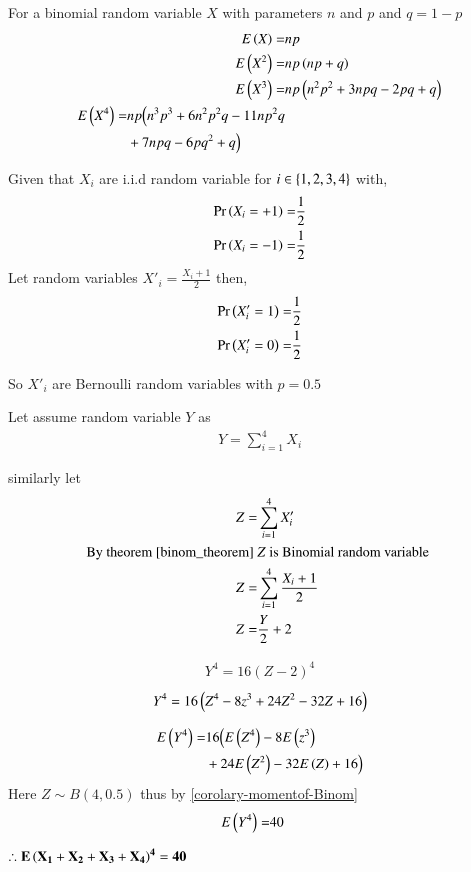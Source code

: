 \documentclass[journal,12pt,twocolumn]{IEEEtran}
\begin{document}
\begin{corollary}
For a binomial random variable $X$ with parameters $n$ and $p$ and $q=1-p$
\begin{align}
    E\left(X\right)=& n p 
    \\E\left(X^2\right)=& n p \left(n p+q\right)
    \\E\left(X^3\right)=& n p \left(n^{2} p^{2} + 3 n p q - 2 p q + q\right)
    \\
    \begin{split}
         E\left(X^4\right)=&n p \Bigl(n^{3} p^{3} + 6 n^{2} p^{2} q
        - 11 n p^{2} q  \\& + 7 n p q - 6 p q^{2} + q\Bigr)
    \end{split}
\end{align}
\label{corolary-momentof-Binom}
\end{corollary}
Given that $X_i$ are i.i.d random variable for $i \in \left\{1,2,3,4\right\} $ 
with,
\begin{align}
    \Pr\left(X_i=+1\right)=&\frac{1}{2}
    \\\Pr\left(X_i=-1\right)=&\frac{1}{2}
\end{align}
Let random variables $X'_i=\frac{X_i+1}{2}$ then,
\begin{align}
    \Pr\left(X'_i=1\right)=&\frac{1}{2}
    \\\Pr\left(X'_i=0\right)=&\frac{1}{2}
\end{align}

So $X'_i$ are Bernoulli random variables with $p=0.5$

Let assume random variable $Y$ as
\begin{align}
Y=\sum_{i=1}^{4}X_i
\end{align} 

similarly let 
\begin{align}
Z=&\sum_{i=1}^{4}X'_i
\\ \nonumber \text{By theorem \ref{binom_theorem} } &  Z \text{ is Binomial random variable }
\\ Z=&\sum_{i=1}^{4} \frac{X_i+1}{2}
\\ Z=&\frac{Y}{2} + 2
\end{align}



\begin{align}
    {Y^4}=16{(Z-2)^4}
\end{align}
\begin{align}
    {Y^4}=16\left(Z^4-8z^3+24Z^2-32Z+16\right)
\end{align}

\begin{align}
\begin{split}
    E\left(Y^4\right)=&16\Bigl(E\left(Z^4\right)-8E\left(z^3\right)
    \\&+24E\left(Z^2\right)-32E\left(Z\right)+16\Bigr)
\end{split}    
\end{align}
Here $Z \sim {B} (4,0.5)$ thus by \ref{corolary-momentof-Binom}
\begin{align}
    E\left(Y^4\right)=&40 &
\end{align}

{\centering
$\mathbf{\therefore E\left(X_1+X_2 +X_3 +X_4\right)^4=40}$

}
\end{document}
